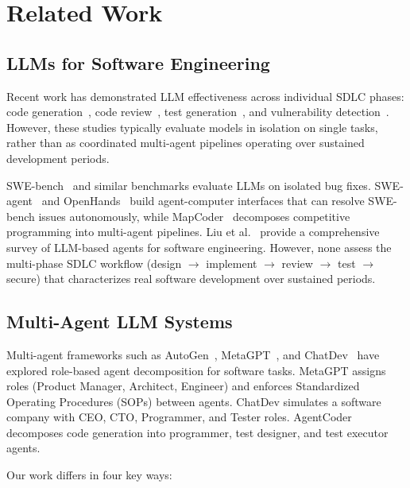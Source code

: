 \documentclass[a4paper,USenglish,cleveref,autoref]{lipics-v2021}
\begin{document}
\section{Related Work}
\label{sec:related}

\subsection{LLMs for Software Engineering}

Recent work has demonstrated LLM effectiveness across individual SDLC phases: code generation~\cite{chen2021, li2023starcoder}, code review~\cite{li2022, tufano2022}, test generation~\cite{lemieux2023}, and vulnerability detection~\cite{pearce2023}. However, these studies typically evaluate models in isolation on single tasks, rather than as coordinated multi-agent pipelines operating over sustained development periods.

SWE-bench~\cite{jimenez2024} and similar benchmarks evaluate LLMs on isolated bug fixes. SWE-agent~\cite{yang2024} and OpenHands~\cite{wang2024openhands} build agent-computer interfaces that can resolve SWE-bench issues autonomously, while MapCoder~\cite{islam2024} decomposes competitive programming into multi-agent pipelines. Liu et al.~\cite{liu2024survey} provide a comprehensive survey of LLM-based agents for software engineering. However, none assess the multi-phase SDLC workflow (design $\rightarrow$ implement $\rightarrow$ review $\rightarrow$ test $\rightarrow$ secure) that characterizes real software development over sustained periods.

\subsection{Multi-Agent LLM Systems}

Multi-agent frameworks such as AutoGen~\cite{wu2023}, MetaGPT~\cite{hong2023}, and ChatDev~\cite{qian2023} have explored role-based agent decomposition for software tasks. MetaGPT assigns roles (Product Manager, Architect, Engineer) and enforces Standardized Operating Procedures (SOPs) between agents. ChatDev simulates a software company with CEO, CTO, Programmer, and Tester roles. AgentCoder~\cite{huang2024} decomposes code generation into programmer, test designer, and test executor agents.

Our work differs in four key ways:
\end{document}
